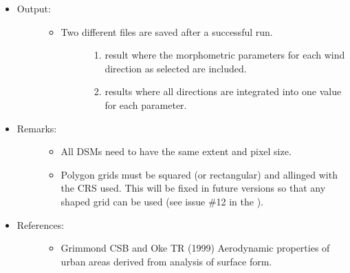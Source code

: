 \documentclass[letterpaper,10pt,english]{sphinxmanual}
\begin{document}
\begin{itemize}
\item {} \begin{description}
\item[{Output:}] \leavevmode\begin{itemize}
\item {} \begin{description}
\item[{Two different files are saved after a successful run.}] \leavevmode\begin{enumerate}
\item {} 
 result where the morphometric parameters for each wind direction as selected are included.

\item {} 
 results where all directions are integrated into one value for each parameter.

\end{enumerate}

\end{description}

\end{itemize}

\end{description}

\item {} \begin{description}
\item[{Remarks:}] \leavevmode\begin{itemize}
\item {} 
All DSMs need to have the same extent and pixel size.

\item {} 
Polygon grids must be squared (or rectangular) and allinged with the CRS used. This will be fixed in future versions so that any shaped grid can be used (see issue \#12 in the ).

\end{itemize}

\end{description}

\item {} \begin{description}
\item[{References:}] \leavevmode\begin{itemize}
\item {} 
Grimmond CSB and Oke TR (1999) Aerodynamic properties of urban areas derived from analysis of surface form. 


\end{itemize}
\end{description}
\end{itemize}
\end{document}
